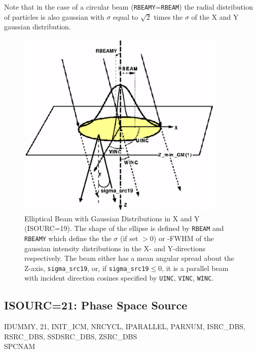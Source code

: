 \documentclass[12pt,twoside]{article}
\newcommand{\cen}[1]{\begin{center} #1 \end{center}                   }
\begin{document}
Note that in the case of a circular beam ({\tt RBEAMY}={\tt RBEAM})
the radial distribution of particles is also gaussian with
$\sigma$ equal to $\sqrt{2}$ times the $\sigma$ of the X and Y gaussian distribution.
\begin{figure}[H]
\vspace*{-0.5cm}
\begin{center}
\leavevmode
\includegraphics[height=9cm]{figures/src19}
\caption[ISOURC=19: Elliptical beam with gaussian distributions in X and Y.]
{Elliptical Beam with Gaussian Distributions in X and Y (ISOURC=19).  The shape
of the ellipse is defined by {\tt RBEAM} and {\tt RBEAMY} which define the
the $\sigma$ (if set $>$0) or -FWHM of the gaussian intensity
distributions in the X- and Y-directions respectively.
The beam either has a
mean angular spread about the Z-axis, {\tt sigma\_src19}, or, if
{\tt sigma\_src19}$\leq$0, it is a parallel beam with incident direction
cosines specified by {\tt UINC}, {\tt VINC}, {\tt WINC}.}
\label{fig_src19}
\end{center}
\end{figure}

\clearpage

\subsection{ISOURC=21: Phase Space Source}
\label{phspsrcsect}

\cen{IDUMMY, 21, INIT\_ICM, NRCYCL, IPARALLEL, PARNUM, ISRC\_DBS,
RSRC\_DBS, SSDSRC\_DBS, ZSRC\_DBS \\SPCNAM}
\end{document}
